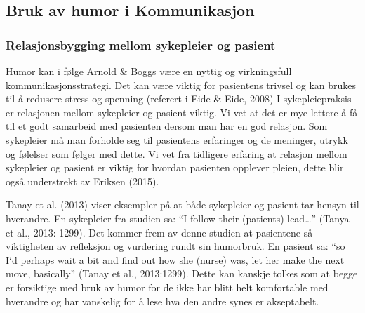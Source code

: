 \subsection{Bruk av humor i Kommunikasjon}

\subsubsection{Relasjonsbygging mellom sykepleier og pasient}

Humor kan i følge Arnold \&{} Boggs være en nyttig og virkningsfull
kommunikasjonsstrategi. Det kan være viktig for pasientens trivsel og kan
brukes til å redusere stress og spenning (referert i Eide \&{} Eide, 2008) I
sykepleiepraksis er relasjonen mellom sykepleier og pasient viktig. Vi vet at
det er mye lettere å få til et godt samarbeid med pasienten dersom man har en
god relasjon. Som sykepleier må man forholde seg til pasientens erfaringer og
de meninger, utrykk og følelser som følger med dette. Vi vet fra tidligere
erfaring at relasjon mellom sykepleier og pasient er viktig for hvordan
pasienten opplever pleien, dette blir også understrekt av Eriksen (2015).

Tanay et al. (2013) viser eksempler på at både sykepleier og pasient tar hensyn
til hverandre. En sykepleier fra studien sa: “I follow their (patients) lead…”
(Tanya et al., 2013: 1299). Det kommer frem av denne studien at pasientene så
viktigheten av refleksjon og vurdering rundt sin humorbruk. En pasient sa: “so
I`d perhaps wait a bit and find out how she (nurse) was, let her make the next
move, basically” (Tanay et al., 2013:1299).  Dette kan kanskje tolkes som at
begge er forsiktige med bruk av humor for de ikke har blitt helt komfortable
med hverandre og har vanskelig for å lese hva den andre synes er akseptabelt.

